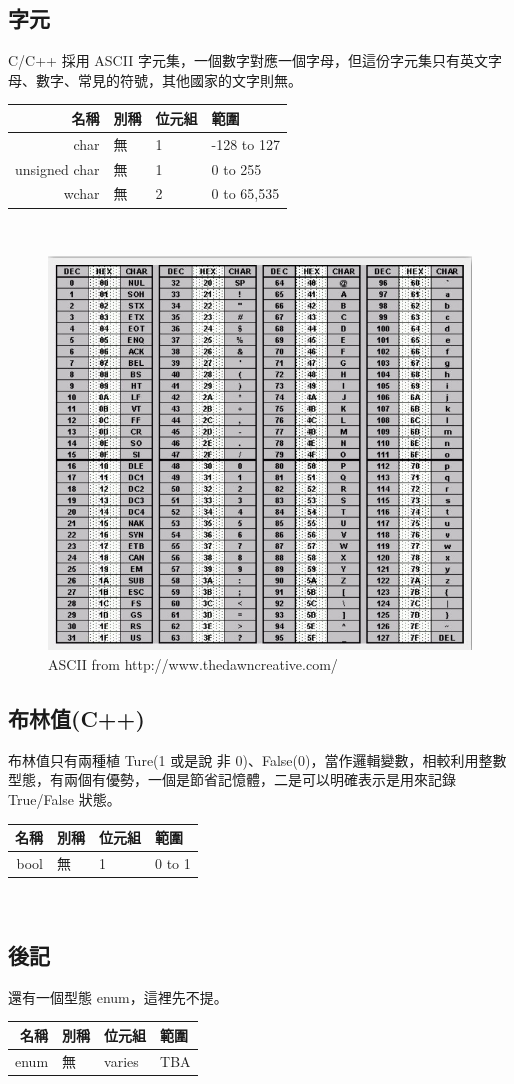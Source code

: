 \subsection{字元}
C/C++ 採用 ASCII 字元集，一個數字對應一個字母，但這份字元集只有英文字母、數字、常見的符號，其他國家的文字則無。\\
\begin{tabular}{|r|l|l|l|} \hline 名稱 & 別稱 & 位元組 & 範圍\\\hline char & 無 & 1 & -128 to 127 \\\hline unsigned char & 無 & 1 & 0 to 255 \\\hline wchar & 無 & 2 & 0 to 65,535 \\\hline\end{tabular}\\
\begin{figure}
  \includegraphics[]{Type/ASCII.jpg}
  \caption{ASCII from http://www.thedawncreative.com/}
  \label{fig:ASCII}
\end{figure}
\subsection{布林值(C++)}
布林值只有兩種植 Ture(1 或是說 非 0)、False(0)，當作邏輯變數，相較利用整數型態，有兩個有優勢，一個是節省記憶體，二是可以明確表示是用來記錄 True/False 狀態。\\
\begin{tabular}{|r|l|l|l|} \hline 名稱 & 別稱 & 位元組 & 範圍\\\hline bool & 無 & 1 & 0 to 1 \\\hline\end{tabular}\\
\subsection{後記}
還有一個型態 enum，這裡先不提。\\
\begin{tabular}{|r|l|l|l|} \hline 名稱 & 別稱 & 位元組 & 範圍\\\hline enum & 無 & varies & TBA \\\hline\end{tabular}\\
